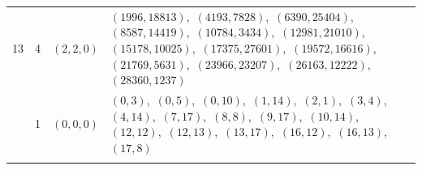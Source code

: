 \documentclass[11pt]{article}
\begin{document}
\begin{longtable}{@{}rrl>{\raggedright\arraybackslash}p{}@{}}
13 & 4 & $(2,2,0)$ & $(1996,18813)$,\allowbreak\ $(4193,7828)$,\allowbreak\ $(6390,25404)$,\allowbreak\ $(8587,14419)$,\allowbreak\ $(10784,3434)$,\allowbreak\ $(12981,21010)$,\allowbreak\ $(15178,10025)$,\allowbreak\ $(17375,27601)$,\allowbreak\ $(19572,16616)$,\allowbreak\ $(21769,5631)$,\allowbreak\ $(23966,23207)$,\allowbreak\ $(26163,12222)$,\allowbreak\ $(28360,1237)$\\
\addlinespace[3pt]
19 & 1 & $(0,0,0)$ & $(0,3)$,\allowbreak\ $(0,5)$,\allowbreak\ $(0,10)$,\allowbreak\ $(1,14)$,\allowbreak\ $(2,1)$,\allowbreak\ $(3,4)$,\allowbreak\ $(4,14)$,\allowbreak\ $(7,17)$,\allowbreak\ $(8,8)$,\allowbreak\ $(9,17)$,\allowbreak\ $(10,14)$,\allowbreak\ $(12,12)$,\allowbreak\ $(12,13)$,\allowbreak\ $(13,17)$,\allowbreak\ $(16,12)$,\allowbreak\ $(16,13)$,\allowbreak\ $(17,8)$\\
\addlinespace[3pt]
\end{longtable}
\endgroup
\end{document}
